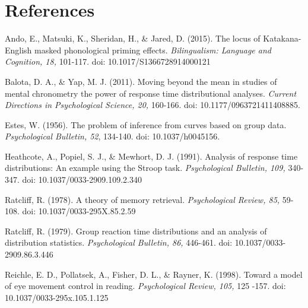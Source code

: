 \documentclass[man]{apa}%
\begin{document}
\newpage

\section{References}

Ando, E., Matsuki, K., Sheridan, H., \& Jared, D. (2015). The locus of Katakana-English masked phonological priming effects. \emph{Bilingualism: Language and Cognition, 18,} 101-117. doi: 10.1017/S1366728914000121


Balota, D. A., \& Yap, M. J. (2011). Moving beyond the mean in studies of mental chronometry the power of response time distributional analyses. \emph{Current Directions in Psychological Science, 20,} 160-166. doi: 10.1177/0963721411408885.



Estes, W. (1956). The problem of inference from curves based on group data. \emph{Psychological Bulletin, 52}, 134-140. doi: 10.1037/h0045156.




Heathcote, A., Popiel, S. J., \& Mewhort, D. J. (1991). Analysis of response time distributions: An example using the Stroop task. \emph{Psychological Bulletin, 109,} 340-347. doi: 10.1037/0033-2909.109.2.340



Ratcliff, R. (1978). A theory of memory retrieval. \emph{Psychological Review, 85,} 59-108. doi: 10.1037/0033-295X.85.2.59 

Ratcliff, R. (1979). Group reaction time distributions and an analysis of distribution statistics. \emph{Psychological Bulletin, 86,} 446-461. doi: 10.1037/0033-2909.86.3.446

Reichle, E. D., Pollatsek, A., Fisher, D. L., \& Rayner, K. (1998). Toward a model of eye movement control in reading. \emph{Psychological Review, 105,} 125 -157. doi: 10.1037/0033-295x.105.1.125
\end{document}
